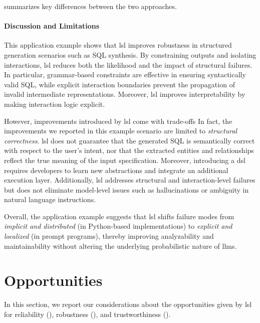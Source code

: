 \documentclass[manuscript,screen]{acmart}
\begin{document}
 summarizes key differences between the two approaches.

\paragraph{Discussion and Limitations}

This application example shows that \ac{lsl} improves robustness in structured generation scenarios such as SQL synthesis. 
By constraining outputs and isolating interactions, \ac{lsl} reduces both the likelihood and the impact of structural failures. 
In particular, grammar-based constraints are effective in ensuring syntactically valid SQL, while explicit interaction boundaries prevent the propagation of invalid intermediate representations. 
Moreover, \ac{lsl} improves interpretability by making interaction logic explicit.

However, improvements introduced by \ac{lsl} come with trade-offs 
In fact, the improvements we reported in this example scenario are limited to \emph{structural correctness}. 
\ac{lsl} does not guarantee that the generated SQL is semantically correct with respect to the user's intent, nor that the extracted entities and relationships reflect the true meaning of the input specification.
Moreover, introducing a \ac{dsl} requires developers to learn new abstractions and integrate an additional execution layer.
Additionally, \ac{lsl} addresses structural and interaction-level failures but does not eliminate model-level issues such as hallucinations or ambiguity in natural language instructions.

Overall, the application example suggests that \ac{lsl} shifts failure modes from \emph{implicit and distributed} (in Python-based implementations) to \emph{explicit and localized} (in prompt programs), thereby improving analyzability and maintainability without altering the underlying probabilistic nature of \acp{llm}.

\section{Opportunities}
\label{sec:opportunities}

In this section, we report our considerations about the opportunities given by \ac{lsl} for reliability (), robustness (), and trustworthiness ().
\end{document}
